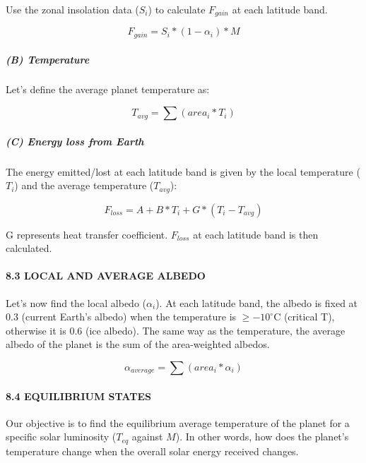 \documentclass[
  letterpaper,
  DIV=11,
  numbers=noendperiod]{scrartcl}
\let\oldparagraph\paragraph
\renewcommand{\paragraph}[1]{\oldparagraph{#1}\mbox{}}
\let\oldsubparagraph\subparagraph
\renewcommand{\subparagraph}[1]{\oldsubparagraph{#1}\mbox{}}
\begin{document}
Use the zonal insolation data (\(S_i\)) to calculate \(F_{gain}\) at
each latitude band.

\begin{equation}
\tag{8}
F_{gain} = S_i * (1-\alpha_i) * M
\end{equation}

\hypertarget{b-temperature}{%
\subparagraph{(B) Temperature}\label{b-temperature}}

Let's define the average planet temperature as:

\begin{equation}
\tag{9}
T_{avg} = \sum(area_i * T_i)
\end{equation}

\hypertarget{c-energy-loss-from-earth}{%
\subparagraph{(C) Energy loss from
Earth}\label{c-energy-loss-from-earth}}

The energy emitted/lost at each latitude band is given by the local
temperature (\(T_i\)) and the average temperature (\(T_{avg}\)):

\begin{equation}
\tag{10}
F_{loss} = A + B * T_i + G * (T_i - T_{avg})
\end{equation}

G represents heat transfer coefficient. \(F_{loss}\) at each latitude
band is then calculated.

\hypertarget{local-and-average-albedo}{%
\paragraph{8.3 LOCAL AND AVERAGE
ALBEDO}\label{local-and-average-albedo}}

Let's now find the local albedo (\(\alpha_i\)). At each latitude band,
the albedo is fixed at 0.3 (current Earth's albedo) when the temperature
is \(\ge -10^\circ\)C (critical T), otherwise it is 0.6 (ice albedo).
The same way as the temperature, the average albedo of the planet is the
sum of the area-weighted albedos.

\begin{equation}
\tag{11}
\alpha_{average} = \sum(area_i * \alpha_i)
\end{equation}

\hypertarget{equilibrium-states}{%
\paragraph{8.4 EQUILIBRIUM STATES}\label{equilibrium-states}}

Our objective is to find the equilibrium average temperature of the
planet for a specific solar luminosity (\(T_{eq}\) against \(M\)). In
other words, how does the planet's temperature change when the overall
solar energy received changes.
\end{document}
